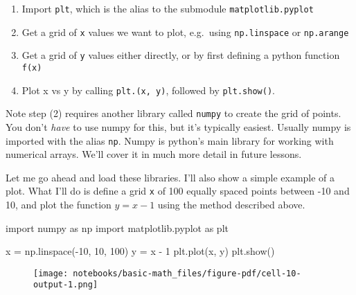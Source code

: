 \documentclass[
  letterpaper,
  DIV=11,
  numbers=noendperiod]{scrreprt}
\newenvironment{Shaded}{\begin{snugshade}}{\end{snugshade}}
\newcommand{\DecValTok}[1]{\textcolor[rgb]{0.68,0.00,0.00}{#1}}
\newcommand{\ImportTok}[1]{\textcolor[rgb]{0.00,0.46,0.62}{#1}}
\newcommand{\NormalTok}[1]{\textcolor[rgb]{0.00,0.23,0.31}{#1}}
\newcommand{\OperatorTok}[1]{\textcolor[rgb]{0.37,0.37,0.37}{#1}}
\providecommand{\tightlist}{%
  \setlength{\itemsep}{0pt}\setlength{\parskip}{0pt}}\usepackage{longtable,booktabs,array}
\begin{document}
\begin{enumerate}
\def\labelenumi{\arabic{enumi}.}
\tightlist
\item
  Import \texttt{plt}, which is the alias to the submodule
  \texttt{matplotlib.pyplot}
\item
  Get a grid of \texttt{x} values we want to plot, e.g.~using
  \texttt{np.linspace} or \texttt{np.arange}
\item
  Get a grid of \texttt{y} values either directly, or by first defining
  a python function \texttt{f(x)}
\item
  Plot x vs y by calling \texttt{plt.(x,\ y)}, followed by
  \texttt{plt.show()}.
\end{enumerate}

Note step (2) requires another library called \texttt{numpy} to create
the grid of points. You don't \emph{have} to use numpy for this, but
it's typically easiest. Usually numpy is imported with the alias
\texttt{np}. Numpy is python's main library for working with numerical
arrays. We'll cover it in much more detail in future lessons.

Let me go ahead and load these libraries. I'll also show a simple
example of a plot. What I'll do is define a grid \texttt{x} of 100
equally spaced points between -10 and 10, and plot the function
\(y=x-1\) using the method described above.

\begin{Shaded}
\begin{Highlighting}[]
\ImportTok{import}\NormalTok{ numpy }\ImportTok{as}\NormalTok{ np}
\ImportTok{import}\NormalTok{ matplotlib.pyplot }\ImportTok{as}\NormalTok{ plt}
\end{Highlighting}
\end{Shaded}

\begin{Shaded}
\begin{Highlighting}[]
\NormalTok{x }\OperatorTok{=}\NormalTok{ np.linspace(}\OperatorTok{{-}}\DecValTok{10}\NormalTok{, }\DecValTok{10}\NormalTok{, }\DecValTok{100}\NormalTok{)}
\NormalTok{y }\OperatorTok{=}\NormalTok{ x }\OperatorTok{{-}} \DecValTok{1}
\NormalTok{plt.plot(x, y)}
\NormalTok{plt.show()}
\end{Highlighting}
\end{Shaded}

\begin{figure}[H]

{\centering \texttt{[image: notebooks/basic-math\_files/figure-pdf/cell-10-output-1.png]}

}

\end{figure}
\end{document}
